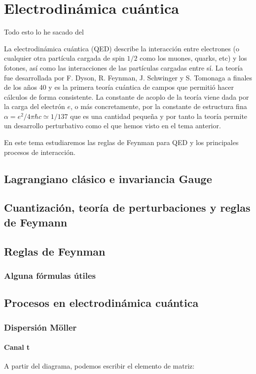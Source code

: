 \setchapterpreamble[u]{\margintoc}
\chapter{Electrodinámica cuántica}

\begin{center}
  \large Todo esto lo he sacado del \cite{Dobdado}
\end{center}
La electrodinámica cuántica (QED) describe la interacción entre electrones (o cualquier otra partícula cargada de spin $1 / 2$ como los muones, quarks, etc) y los fotones, así como las interacciones de las partículas cargadas entre sí. La teoría fue desarrollada por F. Dyson, R. Feynman, J. Schwinger y S. Tomonaga a finales de los años 40 y es la primera teoría cuántica de campos que permitió hacer cálculos de forma consistente. La constante de acoplo de la teoría viene dada por la carga del electrón $e$, o más concretamente, por la constante de estructura fina $\alpha=e^{2} / 4 \pi \hbar c \simeq 1 / 137$ que es una cantidad pequeña y por tanto la teoría permite un desarrollo perturbativo como el que hemos visto en el tema anterior.

En este tema estudiaremos las reglas de Feynman para QED y los principales procesos de interacción.
\section{Lagrangiano clásico e invariancia Gauge}
\section{Cuantización, teoría de perturbaciones y reglas de Feymann}
\section{Reglas de Feynman}
\subsection{Alguna fórmulas útiles}
\section{Procesos en electrodinámica cuántica}
\subsection{Dispersión Möller}
\subsubsection{Canal t}
A partir del diagrama, podemos escribir el elemento de matriz:

